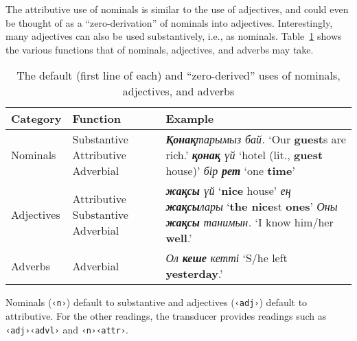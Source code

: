 \documentclass[a4paper,11pt, onecolumn,twoside]{article}
\newcommand{\kazakh}[1]{{\em #1}}
\newcommand{\gloss}[1]{`#1'}
\newcommand{\tag}[1]{\texttt{‹#1›}}
\begin{document}
The attributive use of nominals is similar to the use of adjectives, and could even be thought of as a ``zero-derivation'' of nominals into adjectives.  Interestingly, many adjectives can also be used substantively, i.e., as nominals.  Table~\ref{tab:zeroderiv} shows the various functions that of nominals, adjectives, and adverbs may take.

\begin{table}[htbp]
	\centering
	\caption{The default (first line of each) and ``zero-derived'' uses of nominals, adjectives, and adverbs}\label{tab:zeroderiv}
	\begin{tabular}{lp{5em}p{22em}}
		\toprule
			\textbf{Category} & \textbf{Function} & \textbf{Example} \\
		\midrule
			Nominals & Substantive\newline
							Attributive\newline
							Adverbial
						& \kazakh{\textbf{Қонақ}тарымыз бай.} \gloss{Our \textbf{guest}s are rich.}\newline 
							\kazakh{\textbf{қонақ} үй} \gloss{hotel (lit., \textbf{guest} house)}\newline
							\kazakh{бір \textbf{рет}} \gloss{one \textbf{time}} \\
			Adjectives & Attributive\newline
							Substantive\newline
							Adverbial
						& \kazakh{\textbf{жақсы} үй} \gloss{\textbf{nice} house} \newline
						\kazakh{ең \textbf{жақсы}лары} \gloss{\textbf{the nice}st \textbf{ones}} \newline
						\kazakh{Оны \textbf{жақсы} танимын.} \gloss{I know him/her \textbf{well}.}
						\\
			Adverbs & Adverbial
						& \kazakh{Ол \textbf{кеше} кетті} \gloss{S/he left \textbf{yesterday}.}
						\\
		\bottomrule
	\end{tabular}

\end{table}

Nominals (\tag{n}) default to substantive and adjectives (\tag{adj}) default to attributive.  For the other readings, the transducer provides readings such as \tag{adj}\tag{advl} and \tag{n}\tag{attr}.

\end{document}

